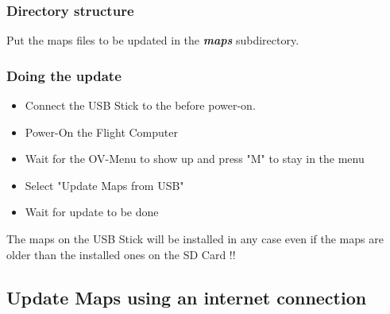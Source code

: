 \subsubsection{Directory structure}

Put the maps files to be updated in the \textsl{\textbf{maps}} subdirectory.

\subsubsection{Doing the update}
\begin{itemize}
	\item Connect the USB Stick to the \ovfc before power-on.
	\item Power-On the Flight Computer
	\item Wait for the OV-Menu to show up and press "M" to stay in the menu
	\item Select "Update Maps from USB"
	\item Wait for update to be done
\end{itemize}

\warning The maps on the USB Stick will be installed in any case even if the maps 
are older than the installed ones on the SD Card !!

\subsection{Update Maps using an internet connection}


\begin{quote}
\ovwebsite{}
\end{quote}